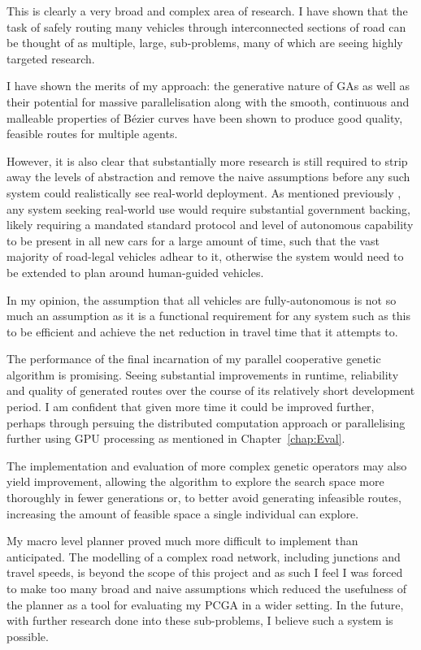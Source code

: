 
This is clearly a very broad and complex area of research. I have shown that the task of safely routing many vehicles through interconnected sections of road can be thought of as multiple, large, sub-problems, many of which are seeing highly targeted research.

I have shown the merits of my approach: the generative nature of GAs as well as their potential for massive parallelisation along with the smooth, continuous and malleable properties of Bézier curves have been shown to produce good quality, feasible routes for multiple agents.

However, it is also clear that substantially more research is still required to strip away the levels of abstraction and remove the naive assumptions before any such system could realistically see real-world deployment. As mentioned previously , any system seeking real-world use would require substantial government backing, likely requiring a mandated standard protocol and level of autonomous capability to be present in all new cars for a large amount of time, such that the vast majority of road-legal vehicles adhear to it, otherwise the system would need to be extended to plan around human-guided vehicles.

In my opinion, the assumption that all vehicles are fully-autonomous is not so much an assumption as it is a functional requirement for any system such as this to be efficient and achieve the net reduction in travel time that it attempts to.

The performance of the final incarnation of my parallel cooperative genetic algorithm is promising. Seeing substantial improvements in runtime, reliability and quality of generated routes over the course of its relatively short development period. I am confident that given more time it could be improved further, perhaps through persuing the distributed computation approach or parallelising further using GPU processing as mentioned in Chapter~\ref{chap:Eval}.

The implementation and evaluation of more complex genetic operators may also yield improvement, allowing the algorithm to explore the search space more thoroughly in fewer generations or, to better avoid generating infeasible routes, increasing the amount of feasible space a single individual can explore.

My macro level planner proved much more difficult to implement than anticipated. The modelling of a complex road network, including junctions and travel speeds, is beyond the scope of this project and as such I feel I was forced to make too many broad and naive assumptions which reduced the usefulness of the planner as a tool for evaluating my PCGA in a wider setting. In the future, with further research done into these sub-problems, I believe such a system is possible.

